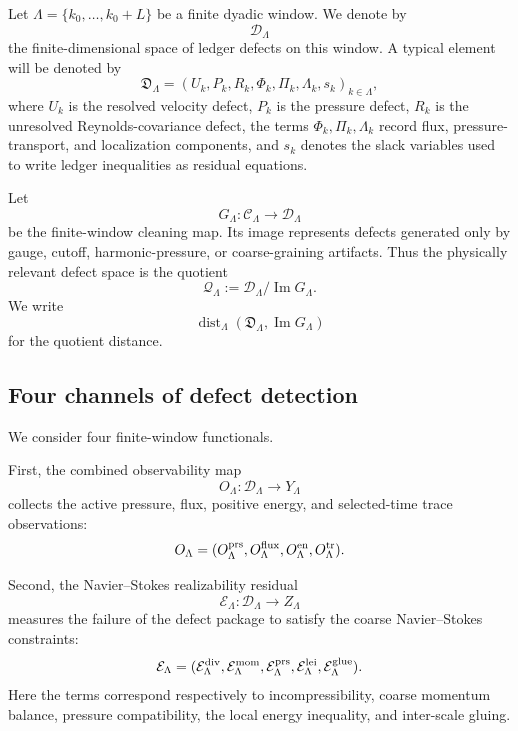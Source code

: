 \documentclass[11pt]{article}
\numberwithin{equation}{section}
\begin{document}
Let \(\Lambda=\{k_0,\ldots,k_0+L\}\) be a finite dyadic window.  We denote
by
\[
        \mathcal D_\Lambda
\]
the finite-dimensional space of ledger defects on this window.  A typical
element will be denoted by
\[
        \mathfrak D_\Lambda
        =
        (U_k,P_k,R_k,\Phi_k,\Pi_k,\Lambda_k,s_k)_{k\in\Lambda},
\]
where \(U_k\) is the resolved velocity defect, \(P_k\) is the pressure
defect, \(R_k\) is the unresolved Reynolds-covariance defect, the terms
\(\Phi_k,\Pi_k,\Lambda_k\) record flux, pressure-transport, and
localization components, and \(s_k\) denotes the slack variables used to
write ledger inequalities as residual equations.

Let
\[
        G_\Lambda:\mathcal C_\Lambda\longrightarrow \mathcal D_\Lambda
\]
be the finite-window cleaning map.  Its image represents defects generated
only by gauge, cutoff, harmonic-pressure, or coarse-graining artifacts.
Thus the physically relevant defect space is the quotient
\[
        \mathcal Q_\Lambda
        :=
        \mathcal D_\Lambda/\operatorname{Im}G_\Lambda .
\]
We write
\[
        \operatorname{dist}_\Lambda
        (\mathfrak D_\Lambda,\operatorname{Im}G_\Lambda)
\]
for the quotient distance.

\subsection{Four channels of defect detection}

We consider four finite-window functionals.

First, the combined observability map
\[
        O_\Lambda:\mathcal D_\Lambda\longrightarrow Y_\Lambda
\]
collects the active pressure, flux, positive energy, and selected-time
trace observations:
\[
        O_\Lambda
        =
        (O_\Lambda^{\rm prs},
         O_\Lambda^{\rm flux},
         O_\Lambda^{\rm en},
         O_\Lambda^{\rm tr}).
\]

Second, the Navier--Stokes realizability residual
\[
        \mathcal E_\Lambda:\mathcal D_\Lambda\longrightarrow Z_\Lambda
\]
measures the failure of the defect package to satisfy the coarse
Navier--Stokes constraints:
\[
        \mathcal E_\Lambda
        =
        (\mathcal E_\Lambda^{\rm div},
         \mathcal E_\Lambda^{\rm mom},
         \mathcal E_\Lambda^{\rm prs},
         \mathcal E_\Lambda^{\rm lei},
         \mathcal E_\Lambda^{\rm glue}).
\]
Here the terms correspond respectively to incompressibility, coarse
momentum balance, pressure compatibility, the local energy inequality, and
inter-scale gluing.
\end{document}
